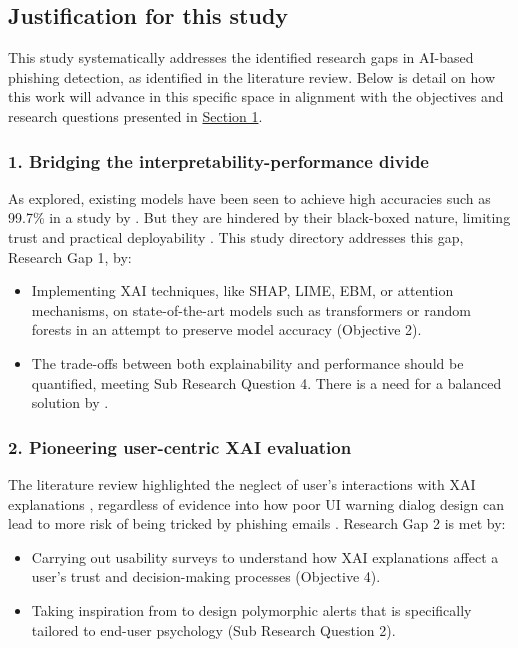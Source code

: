 
\subsection*{Justification for this study}

This study systematically addresses the identified research gaps in AI-based phishing detection, as identified in the literature review. Below is detail on how this work will advance in this specific space in alignment with the objectives and research questions presented in \hyperref[sec:1-introduction]{Section 1}.

\subsubsection*{1. Bridging the interpretability-performance divide}
As explored, existing models have been seen to achieve high accuracies such as 99.7\% in a study by \cite{do2024integrated}. But they are hindered by their black-boxed nature, limiting trust and practical deployability \citep{atlam2022business}. This study directory addresses this gap, Research Gap 1, by:

\begin{itemize}
  \item Implementing XAI techniques, like SHAP, LIME, EBM, or attention mechanisms, on state-of-the-art models such as transformers or random forests in an attempt to preserve model accuracy (Objective 2).
  \item The trade-offs between both explainability and performance should be quantified, meeting Sub Research Question 4. There is a need for a balanced solution by \cite{alzahrani2024explainable}.
\end{itemize}

\subsubsection*{2. Pioneering user-centric XAI evaluation}
The literature review highlighted the neglect of user's interactions with XAI explanations \citep{vo2024securing}, regardless of evidence into how poor UI warning dialog design can lead to more risk of being tricked by phishing emails \citep{greco2023explaining}. Research Gap 2 is met by:

\begin{itemize}
  \item Carrying out usability surveys to understand how XAI explanations affect a user's trust and decision-making processes (Objective 4).
  \item Taking inspiration from \cite{anderson2015polymorphic} to design polymorphic alerts that is specifically tailored to end-user psychology (Sub Research Question 2).
\end{itemize}

